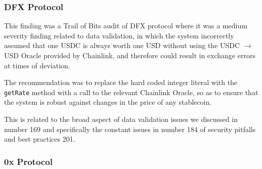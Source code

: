 \subsubsection{DFX Protocol}\label{dfx-protocol}

This finding was a Trail of Bits audit of DFX protocol where it was a
medium severity finding related to data validation, in which the system
incorrectly assumed that one USDC is always worth one USD without using
the USDC \(\rightarrow\) USD Oracle provided by Chainlink, and therefore
could result in exchange errors at times of deviation.

The recommendation was to replace the hard coded integer literal with
the \texttt{getRate} method with a call to the relevant Chainlink
Oracle, so as to ensure that the system is robust against changes in the
price of any stablecoin.

This is related to the broad aspect of data validation issues we
discussed in number 169 and specifically the constant issues in number
184 of security pitfalls and best practices 201.

\subsubsection{0x Protocol}\label{x-protocol}

